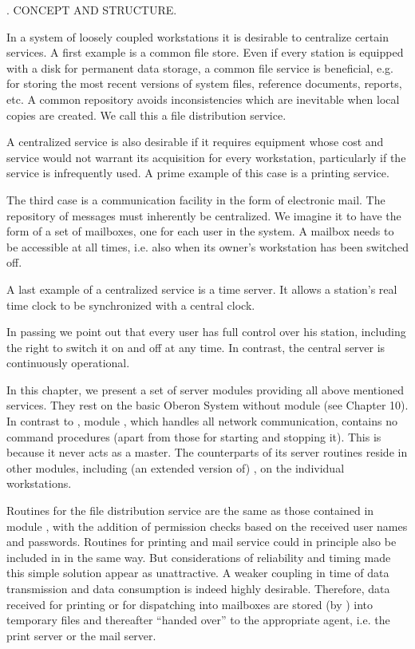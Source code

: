 . CONCEPT AND STRUCTURE.

In a system of loosely coupled workstations it is desirable to centralize certain services. A first example is a common file store. Even if every station is equipped with a disk for permanent data storage, a common file service is beneficial, e.g. for storing the most recent versions of system files, reference documents, reports, etc. A common repository avoids inconsistencies which are inevitable when local copies are created. We call this a file distribution service.

A centralized service is also desirable if it requires equipment whose cost and service would not warrant its acquisition for every workstation, particularly if the service is infrequently used. A prime example of this case is a printing service.

The third case is a communication facility in the form of electronic mail. The repository of messages must inherently be centralized. We imagine it to have the form of a set of mailboxes, one for each user in the system. A mailbox needs to be accessible at all times, i.e. also when its owner's workstation has been switched off.

A last example of a centralized service is a time server. It allows a station's real time clock to be synchronized with a central clock.

In passing we point out that every user has full control over his station, including the right to switch it on and off at any time. In contrast, the central server is continuously operational.

In this chapter, we present a set of server modules providing all above mentioned services. They rest on the basic Oberon System without module  (see Chapter 10). In contrast to , module , which handles all network communication, contains no command procedures (apart from those for starting and stopping it). This is because it never acts as a master. The counterparts of its server routines reside in other modules, including (an extended version of) , on the individual workstations.

Routines for the file distribution service are the same as those contained in module , with the addition of permission checks based on the received user names and passwords. Routines for printing and mail service could in principle also be included in  in the same way. But considerations of reliability and timing made this simple solution appear as unattractive. A weaker coupling in time of data transmission and data consumption is indeed highly desirable. Therefore, data received for printing or for dispatching into mailboxes are stored (by ) into temporary files and thereafter ``handed over'' to the appropriate agent, i.e. the print server or the mail server.

